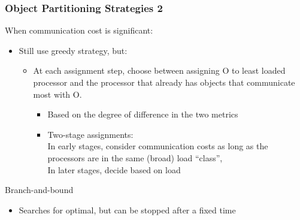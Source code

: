 \begin{frame}[fragile]
\frametitle{Object Partitioning Strategies 2}
When communication cost is significant:
\begin{itemize}
 \item Still use greedy strategy, but:
 \begin{itemize}
  \item At each assignment step, choose between assigning O to least loaded processor and the processor that already has objects that communicate most with O.
  \begin{itemize}
   \item Based on the degree of difference in the two metrics
   \item Two-stage assignments:\\
    In early stages,  consider communication costs as long as the processors are
    in the same (broad) load “class”,\\
    In later stages, decide based on load
  \end{itemize}
 \end{itemize}
\end{itemize}
Branch-and-bound
\begin{itemize}
 \item Searches for optimal, but can be stopped after a fixed time
\end{itemize}
\end{frame}

